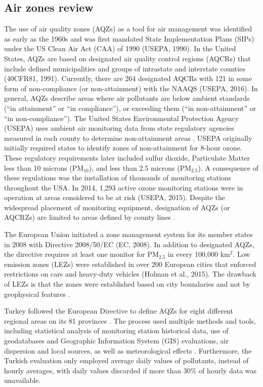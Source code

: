 \subsection{Air zones review}
The use of air quality zones (AQZs) as a tool for air management was identified as early as the 1960s \citep{Breivogel1961, Holland1960} and was first mandated State Implementation Plans (SIPs) under the US Clean Air Act (CAA) of 1990 (USEPA, 1990). In the United States, AQZs are based on designated air quality control regions (AQCRs) that include defined municipalities and groups of intrastate and interstate counties (40CFR81, 1991). Currently, there are 264 designated AQCRs with 121 in some form of non-compliance (or non-attainment) with the NAAQS (USEPA, 2016). In general, AQZs describe areas where air pollutants are below ambient standards (“in attainment” or “in compliance”), or exceeding them (“in non-attainment” or “in non-compliance”).  The United States Environmental Protection Agency (USEPA) uses ambient air monitoring data from state regulatory agencies measured in each county to determine non-attainment areas \citep{Carr2012}.  USEPA originally initially required states to identify zones of non-attainment for 8-hour ozone.  These regulatory requirements later included sulfur dioxide, Particulate Matter less than 10 microns (PM$_{10}$), and less than 2.5 microns (PM$_{2.5}$).  A consequence of these regulations was the installation of thousands of monitoring stations throughout the USA.  In 2014, 1,293 active ozone monitoring stations were in operation at areas considered to be at risk (USEPA, 2015).  Despite the widespread placement of monitoring equipment, designation of AQZs (or AQCRZs) are limited to areas defined by county lines \citep{Carr2012}.

The European Union initiated a zone management system for its member states in 2008 with Directive 2008/50/EC (EC, 2008).  In addition to designated AQZs, the directive requires at least one monitor for PM$_{2.5}$ in every 100,000 km$^{2}$.  Low emission zones (LEZs) were established in over 200 European cities that enforced restrictions on cars and heavy-duty vehicles (Holman et al., 2015).  The drawback of LEZs is that the zones were established based on city boundaries and not by geophysical features \citep{Henschel2013}.

Turkey followed the European Directive to define AQZs for eight different regional areas on its 81 provinces \citep{CYGM2010}.  The process used multiple methods and tools, including statistical analysis of monitoring station historical data, use of geodatabases and Geographic Information System (GIS) evaluations, air dispersion and local sources, as well as meteorological effects \citep{Karaca2012}.  Furthermore, the Turkish evaluation only employed average daily values of pollutants, instead of hourly averages, with daily values discarded if more than 30\% of hourly data was unavailable.  

